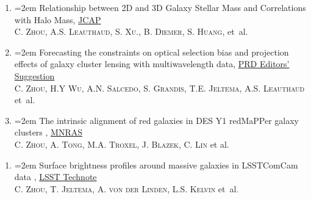 \documentclass{scrartcl}
\newcommand{\paper}[1]{\noindent\hangindent=2em\hangafter=0 \footnotesize #1  %
\vspace{0.5em}} %
\begin{document}
\begin{cv}{}
\begin{enumerate}
    \item \paper{Relationship between 2D and 3D Galaxy Stellar Mass and Correlations with Halo Mass,  \href{https://iopscience.iop.org/article/10.1088/1475-7516/2025/10/014/meta}{JCAP}}\\
    \textsc{C. Zhou, A.S. Leauthaud, S. Xu., B. Diemer, S. Huang,} et~al.

    \item \paper{Forecasting the constraints on optical selection bias and projection effects of galaxy cluster lensing with multiwavelength data, \href{https://journals.aps.org/prd/abstract/10.1103/PhysRevD.110.103508}{PRD Editors’ Suggestion} }\\
    \textsc{C. Zhou, H.Y Wu, A.N. Salcedo, S. Grandis, T.E. Jeltema, A.S. Leauthaud} et~al.

    \item \paper{The intrinsic alignment of red galaxies in DES Y1 redMaPPer galaxy clusters}, \href{https://academic.oup.com/mnras/advance-article/doi/10.1093/mnras/stad2712/7264871}{MNRAS} \\
    \textsc{C. Zhou, A. Tong, M.A. Troxel, J. Blazek, C. Lin} et al.

    \end{enumerate}

        \vspace{0.2em}
    \begin{enumerate}
    \item \paper{Surface brightness profiles around massive galaxies in LSSTComCam data}, \href{https://sitcomtn-165.lsst.io/}{LSST Technote}\\
    \textsc{C. Zhou, T. Jeltema, A. von der Linden, L.S. Kelvin} et~al.

    \end{enumerate}




\end{cv}
\end{document}
